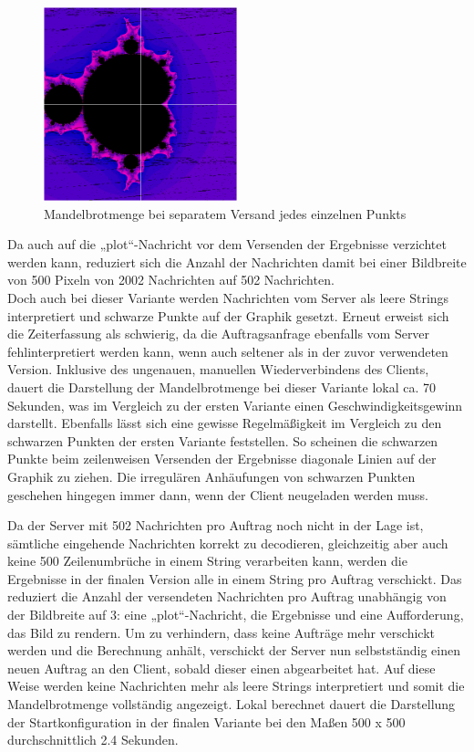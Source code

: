 \documentclass[12pt, onecolumn, notitlepage]{scrartcl}
\begin{document}
\begin{figure}[htbp] 
	\centering
	\includegraphics[width=0.5\textwidth]{zeilenVersandt.PNG}
	\caption{Mandelbrotmenge bei separatem Versand jedes einzelnen Punkts}
	\label{fig:Bild2}
\end{figure}

Da auch auf die „plot“-Nachricht vor dem Versenden der Ergebnisse verzichtet werden kann, reduziert sich die Anzahl der Nachrichten damit bei einer Bildbreite von 500 Pixeln von 2002 Nachrichten auf 502 Nachrichten.\\
Doch auch bei dieser Variante werden Nachrichten vom Server als leere Strings interpretiert und schwarze Punkte auf der Graphik gesetzt. Erneut erweist sich die Zeiterfassung als schwierig, da die Auftragsanfrage ebenfalls vom Server fehlinterpretiert werden kann, wenn auch seltener als in der zuvor verwendeten Version. Inklusive des ungenauen, manuellen Wiederverbindens des Clients, dauert die Darstellung der Mandelbrotmenge bei dieser Variante lokal ca. 70 Sekunden, was im Vergleich zu der ersten Variante einen Geschwindigkeitsgewinn darstellt. Ebenfalls lässt sich eine gewisse Regelmäßigkeit im Vergleich zu den schwarzen Punkten der ersten Variante feststellen. So scheinen die schwarzen Punkte beim zeilenweisen Versenden der Ergebnisse  diagonale Linien auf der Graphik zu ziehen. Die irregulären Anhäufungen von schwarzen Punkten geschehen hingegen immer dann, wenn der Client neugeladen werden muss. \par
Da der Server mit 502 Nachrichten pro Auftrag noch nicht in der Lage ist, sämtliche eingehende Nachrichten korrekt zu decodieren, gleichzeitig aber auch keine 500 Zeilenumbrüche in einem String verarbeiten kann, werden die Ergebnisse in der finalen Version alle in einem String pro Auftrag verschickt. Das reduziert die Anzahl der versendeten Nachrichten pro Auftrag unabhängig von der Bildbreite auf 3: eine „plot“-Nachricht, die Ergebnisse und eine Aufforderung, das Bild zu rendern. Um zu verhindern, dass keine Aufträge mehr verschickt werden und die Berechnung anhält, verschickt der Server nun selbstständig einen neuen Auftrag an den Client, sobald dieser einen abgearbeitet hat. Auf diese Weise werden keine Nachrichten mehr als leere Strings interpretiert und somit die Mandelbrotmenge vollständig angezeigt. Lokal berechnet dauert die Darstellung der Startkonfiguration in der finalen Variante bei den Maßen 500 x 500 durchschnittlich 2.4 Sekunden.\par
\end{document}
